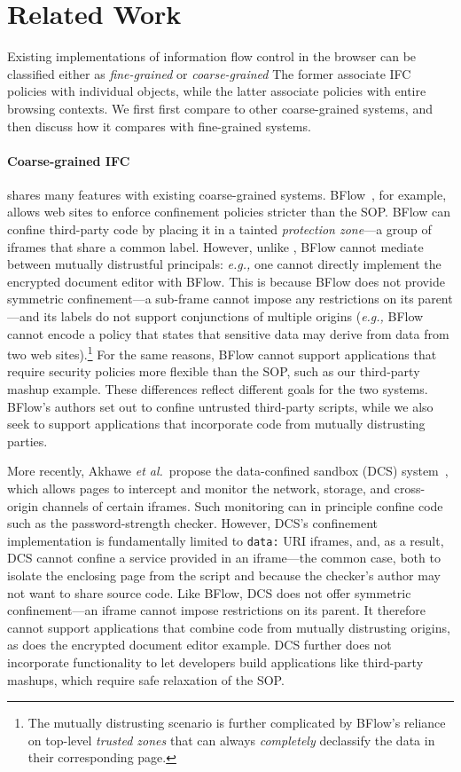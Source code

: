 \section{Related Work}
\label{sec:related}

Existing implementations of information flow control in the browser
can be classified either as \emph{fine-grained} or
\emph{coarse-grained} The former associate IFC policies with
individual objects, while the latter associate policies with entire
browsing contexts. We first first compare \sys{} to other
coarse-grained systems, and then discuss how it compares with
fine-grained systems.

\paragraph{Coarse-grained IFC} \sys{} shares many features
with existing coarse-grained systems.
%
BFlow~\cite{Yip:2009:PBS}, for example, allows web sites to enforce confinement policies
stricter than the SOP\@.
%
BFlow can confine third-party code by placing
it in a tainted \emph{protection zone}---a group
of iframes that share a common label.
%
However, unlike \sys{}, BFlow cannot mediate between mutually
distrustful principals: \emph{e.g.,} one cannot directly implement the
encrypted document editor with BFlow.
%
This is because BFlow does not provide symmetric confinement---a
sub-frame cannot impose any restrictions on its parent---and its
labels do not support conjunctions of multiple origins (\emph{e.g.,} BFlow
cannot encode a policy that states that sensitive data may derive from
data from two web sites).\footnote{ The mutually distrusting scenario
  is further complicated by BFlow's reliance on top-level
  \emph{trusted zones} that can always \emph{completely} declassify
  the data in their corresponding page.}
%
For the same reasons, BFlow cannot support applications that require
security policies more flexible than the SOP, such as our third-party
mashup example.
%
These differences reflect different goals for the two systems. BFlow's
authors set out to confine untrusted third-party scripts, while we
also seek to support applications that incorporate code from mutually
distrusting parties.


More recently, Akhawe \emph{et al.}~propose the data-confined sandbox
(DCS) system~\cite{Akhawe2013}, which allows pages to intercept and
monitor the network, storage, and cross-origin channels of certain
iframes.
%
Such monitoring can in principle confine code such as the
password-strength checker.
%
However, DCS's confinement implementation is fundamentally limited to
\verb|data:| URI iframes, and, as a result, DCS cannot confine a
service provided in an iframe---the common case, both to isolate the
enclosing page from the script and because the checker's author may
not want to share source code\cite{postman}.
%
Like BFlow, DCS does not offer symmetric confinement---an iframe
cannot impose restrictions on its parent. It therefore cannot support
applications that combine code from mutually distrusting origins, as
does the encrypted document editor example.
%
DCS further does not incorporate functionality to let developers build
applications like third-party mashups, which require safe relaxation of the
SOP\@.

